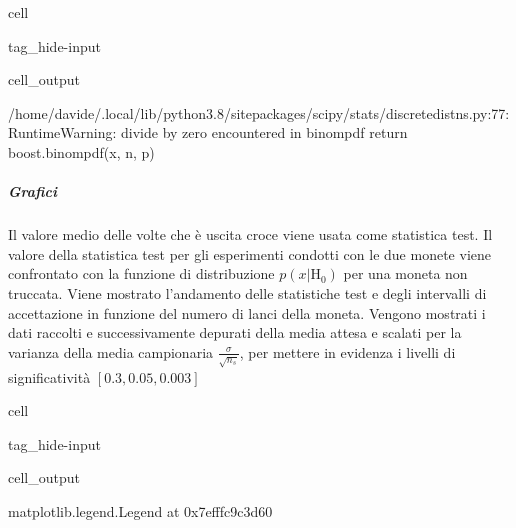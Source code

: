 \documentclass[letterpaper,10pt,italian]{jupyterBook}
\begin{document}
\begin{sphinxuseclass}{cell}
\begin{sphinxuseclass}{tag_hide-input}\begin{sphinxVerbatimOutput}

\begin{sphinxuseclass}{cell_output}
\begin{sphinxVerbatim}[commandchars=\\\{\}]
/home/davide/.local/lib/python3.8/site\PYGZhy{}packages/scipy/stats/\PYGZus{}discrete\PYGZus{}distns.py:77: RuntimeWarning: divide by zero encountered in \PYGZus{}binom\PYGZus{}pdf
  return \PYGZus{}boost.\PYGZus{}binom\PYGZus{}pdf(x, n, p)
\end{sphinxVerbatim}

\end{sphinxuseclass}\end{sphinxVerbatimOutput}

\end{sphinxuseclass}
\end{sphinxuseclass}

\subparagraph{Grafici}
\label{\detokenize{ch/statistics/test-fisher-coin-2:grafici}}
\sphinxAtStartPar
Il valore medio delle volte che è uscita croce viene usata come statistica test. Il valore della statistica test per gli esperimenti condotti con le due monete viene confrontato con la funzione di distribuzione \(p(x|\text{H}_0)\) per una moneta non truccata. Viene mostrato l’andamento delle statistiche test e degli intervalli di accettazione in funzione del numero di lanci della moneta. Vengono mostrati i dati raccolti e successivamente depurati della media attesa e scalati per la varianza della media campionaria \(\frac{\sigma}{\sqrt{n_s}}\), per mettere in evidenza i livelli di significatività \([0.3, 0.05, 0.003]\)

\begin{sphinxuseclass}{cell}
\begin{sphinxuseclass}{tag_hide-input}\begin{sphinxVerbatimOutput}

\begin{sphinxuseclass}{cell_output}
\begin{sphinxVerbatim}[commandchars=\\\{\}]
\PYGZlt{}matplotlib.legend.Legend at 0x7efffc9c3d60\PYGZgt{}
\end{sphinxVerbatim}

\noindent{}

\end{sphinxuseclass}\end{sphinxVerbatimOutput}

\end{sphinxuseclass}
\end{sphinxuseclass}
\sphinxstepscope
\end{document}
